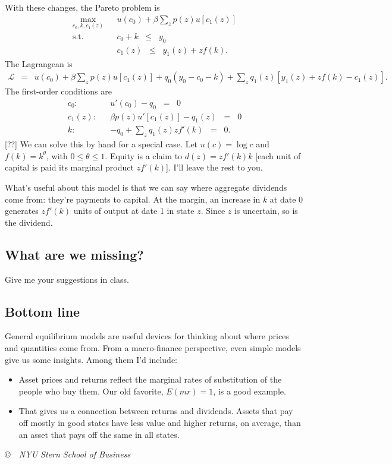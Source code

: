 \documentclass[11pt]{article}
\begin{document}
With these changes, the Pareto problem is
\begin{eqnarray*}
    \max_{c_0,k, c_1(z)} && u(c_0) + \beta \sum_z p(z) u[c_1(z)] \\
    \mbox{s.t.}   &&  c_0  + k \;\;\leq\;\; y_0 \\
                  &&  c_1(z) \;\;\leq\;\; y_1(z) + z f(k) .
\end{eqnarray*}
The Lagrangean is
\begin{eqnarray*}
    \mathcal{L} &=&  u(c_0) + \beta \sum_z p(z) u[c_1(z)] + q_0 (y_0 - c_0 - k)
                    + \sum_z q_1(z)  [ y_1(z) + z f(k) - c_1(z)]  .
\end{eqnarray*}
The first-order conditions are
\begin{eqnarray*}
    c_0: &&  u'(c_0) - q_0 \;\;=\;\; 0 \\
    c_1(z): &&  \beta p(z) u'[c_1(z)] - q_1(z) \;\;=\;\; 0 \\
     k:   && - q_0 + \sum_z q_1(z) z f'(k) \;\;=\;\; 0 .
\end{eqnarray*}
[??]
We can solve this by hand for a special case.
Let $u(c) = \log c$ and $f(k) = k^\theta$, with
$0 \leq \theta \leq 1$.
Equity is a claim to $d(z) = z f'(k) k$
[each unit of capital is paid its marginal product $z f'(k)$].
I'll leave the rest to you.


What's useful about this model is that we can say where
aggregate dividends come from:
they're payments to capital.
At the margin,
an increase in $k$ at date 0 generates $z f'(k)$ units of
output at date 1 in state $z$.
Since $z$ is uncertain, so is the dividend.


\subsection*{What are we missing?}

Give me your suggestions in class.


\subsection*{Bottom line}

General equilibrium models are useful devices for thinking
about where prices and quantities come from.
From a macro-finance perspective,
even simple models give us some insights.
Among them I'd include:
%
\begin{itemize}
\item Asset prices and returns reflect the marginal rates of substitution
of the people who buy them.
Our old favorite, $E(mr) = 1$, is a good example.
\item That gives us a connection between returns and dividends.
Assets that pay off mostly in good states have less value
and higher returns, on average, than an asset that pays off the same in all states.
\end{itemize}
%

\vfill \centerline{\it \copyright \ \number\year \
NYU Stern School of Business}
\end{document}
